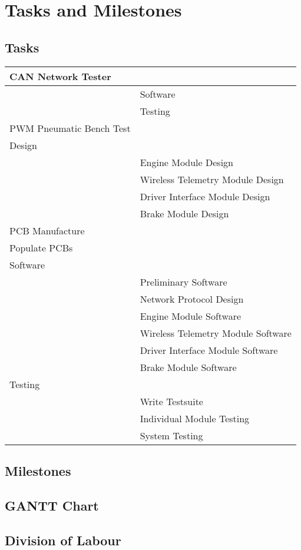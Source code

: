 %
%
%
%

\section{Tasks and Milestones}

\subsection{Tasks}

\begin{tabular}{|l|l|}
\hline
CAN Network Tester&\\
\hline
&Software\\
\hline
&Testing\\
\hline
PWM Pneumatic Bench Test&\\
\hline
Design&\\
\hline
&Engine Module Design\\
\hline
&Wireless Telemetry Module Design\\
\hline
&Driver Interface Module Design\\
\hline
&Brake Module Design\\
\hline
PCB Manufacture&\\
\hline
Populate PCBs&\\
\hline
Software&\\
\hline
&Preliminary Software\\
\hline
&Network Protocol Design\\
\hline
&Engine Module Software\\
\hline
&Wireless Telemetry Module Software\\
\hline
&Driver Interface Module Software\\
\hline
&Brake Module Software\\
\hline
Testing&\\
\hline
&Write Testsuite\\
\hline
&Individual Module Testing\\
\hline
&System Testing\\
\hline
\end{tabular}

\subsection{Milestones}
\subsection{GANTT Chart}
\subsection{Division of Labour}

